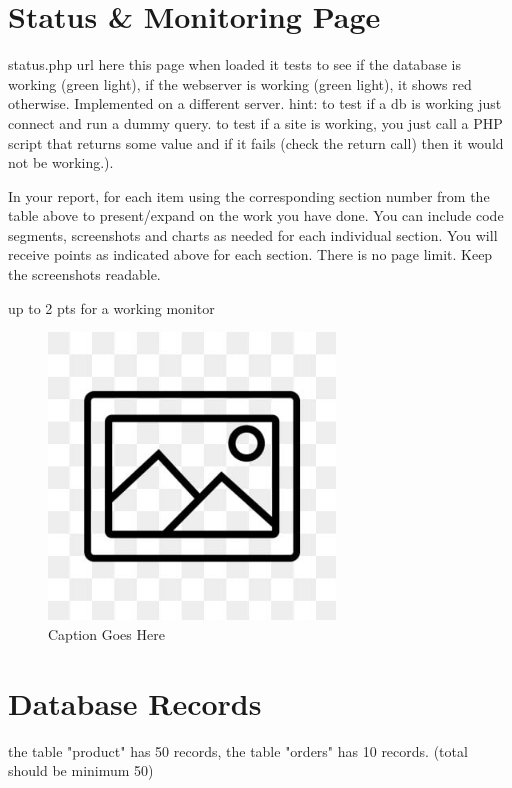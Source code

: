 \documentclass[12pt, letterpaper]{article}
\begin{document}
 \newpage

\section{Status \& Monitoring Page}
status.php url here this page when loaded it tests to see if the database is working (green light), if the webserver is working (green light), it shows red otherwise. Implemented on a different server. hint: to test if a db is working just connect and run a dummy query. to test if a site is working, you just call a PHP script that returns some value and if it fails (check the return call) then it would not be working.).

In your report, for each item using the corresponding section number from the table above to present/expand on the work you have done. You can include code segments, screenshots and charts as needed for each individual section. You will receive points as indicated above for each section. There is no page limit. Keep the screenshots readable.

up to 2 pts for a working monitor

\begin{figure}[htbp]
	\centering
	\includegraphics[width=3in]{images/placeholder.jpg}
	\caption{Caption Goes Here}
 \end{figure}

 \newpage

\section{Database Records}
the table "product" has 50 records, the table "orders" has 10 records. (total should be minimum 50)
\end{document}
